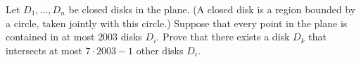 Let $D_1, \ldots, D_n$ be closed disks in the plane. (A closed disk is a region bounded by a circle, taken jointly with this circle.) Suppose that every point in the plane is contained in at most $2003$ disks $D_i$. Prove that there exists a disk $D_k$ that intersects at most $7 \cdot 2003 - 1$ other disks $D_i$.
